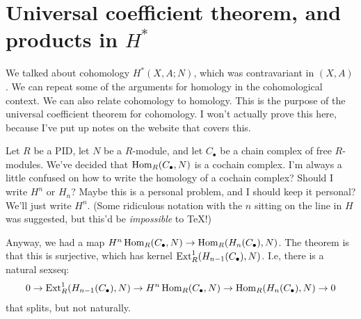 \section{Universal coefficient theorem, and products in $ H^\ast$}
We talked about cohomology $ H^\ast(X,A;N)$, which was contravariant in $(X,A)$. We can repeat some of the arguments for homology in the cohomological context. We can also relate cohomology to homology. This is the purpose of the universal coefficient theorem for cohomology. I won't actually prove this here, because I've put up notes on the website that covers this.
\begin{theorem}
Let $R$ be a PID, let $N$ be a $R$-module, and let $C_\bullet$ be a chain complex of free $R$-modules. We've decided that $\operatorname{Hom}_R(C_\bullet,N)$ is a cochain complex. I'm always a little confused on how to write the homology of a cochain complex? Should I write $ H^n$ or $ H_n$? Maybe this is a personal problem, and I should keep it personal? We'll just write $ H^n$. (Some ridiculous notation with the $n$ sitting on the line in $H$ was suggested, but this'd be \emph{impossible} to TeX!)

Anyway, we had a map $ H^n\operatorname{Hom}_R(C_\bullet,N)\to\operatorname{Hom}_R( H_n(C_\bullet),N)$. The theorem is that this is surjective, which has kernel $\operatorname{Ext}^1_R( H_{n-1}(C_\bullet),N)$. I.e, there is a natural sexseq:
\begin{equation*}
0\to\operatorname{Ext}^1_R( H_{n-1}(C_\bullet),N)\to H^n\operatorname{Hom}_R(C_\bullet,N)\to\operatorname{Hom}_R( H_n(C_\bullet),N)\to 0
\end{equation*}
that splits, but not naturally.
\end{theorem}
